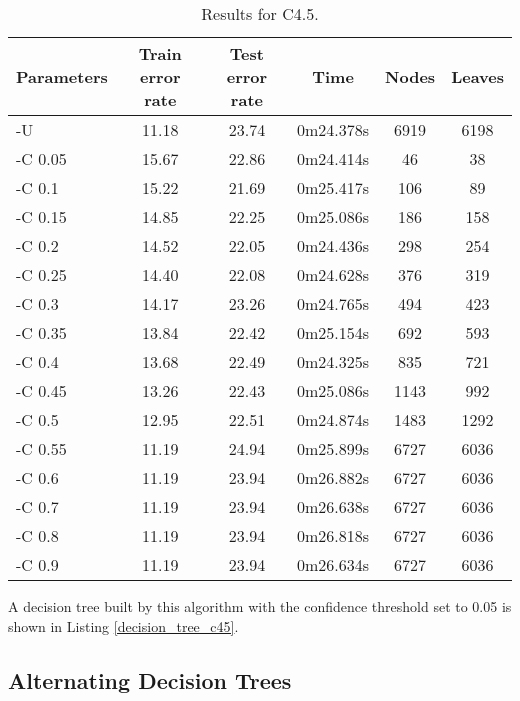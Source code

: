 \documentclass[a4paper]{llncs}
\begin{document}
\begin{table}[ht]
  \begin{center}
  \begin{tabular}{ | l | c | c | c | c | c |}
    \hline
    \textbf{Parameters} & \textbf{Train error rate} & \textbf{Test error rate} & \textbf{Time} & \textbf{Nodes} & \textbf{Leaves} \\ \hline
    -U & 11.18 & 23.74 & 0m24.378s & 6919 & 6198 \\ \hline
    -C 0.05 & 15.67 & 22.86 & 0m24.414s & 46 & 38 \\ \hline
    -C 0.1 & 15.22 & 21.69 & 0m25.417s & 106 & 89 \\ \hline
    -C 0.15 & 14.85 & 22.25 & 0m25.086s & 186 & 158 \\ \hline
    -C 0.2 & 14.52 & 22.05 & 0m24.436s & 298 & 254 \\ \hline
    -C 0.25 & 14.40 & 22.08 & 0m24.628s & 376 & 319 \\ \hline
    -C 0.3 & 14.17 & 23.26 & 0m24.765s & 494 & 423 \\ \hline
    -C 0.35 & 13.84 & 22.42 & 0m25.154s & 692 & 593 \\ \hline
    -C 0.4 & 13.68 & 22.49 & 0m24.325s & 835 & 721 \\ \hline
    -C 0.45 & 13.26 & 22.43 & 0m25.086s & 1143 & 992 \\ \hline
    -C 0.5 & 12.95 & 22.51 & 0m24.874s & 1483 & 1292 \\ \hline
    -C 0.55 & 11.19 & 24.94 & 0m25.899s & 6727 & 6036 \\ \hline
    -C 0.6 & 11.19 & 23.94 & 0m26.882s & 6727 & 6036 \\ \hline
    -C 0.7 & 11.19 & 23.94 & 0m26.638s & 6727 & 6036 \\ \hline
    -C 0.8 & 11.19 & 23.94 & 0m26.818s & 6727 & 6036 \\ \hline
    -C 0.9 & 11.19 & 23.94 & 0m26.634s & 6727 & 6036 \\ \hline
  \end{tabular}
  \caption{Results for C4.5.}
  \label{tbl:results_c45}
  \end{center}
\end{table}

A decision tree built by this algorithm with the confidence threshold set to 0.05 is shown in Listing \ref{decision_tree_c45}.

\subsection{Alternating Decision Trees}
\end{document}
